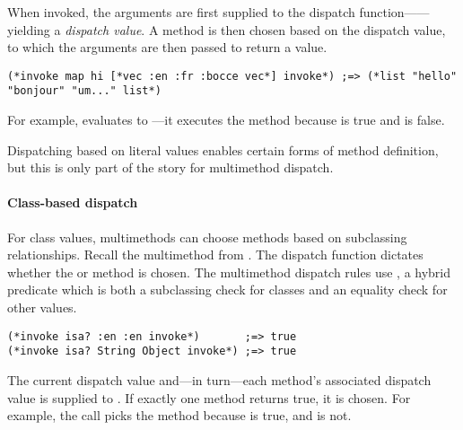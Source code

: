 When invoked, the arguments are first supplied to the dispatch function------yielding
a \emph{dispatch value}. A method is then chosen
based on the dispatch value, to which the arguments are then passed to return a value.
%
\begin{lstlisting}
(*invoke map hi [*vec :en :fr :bocce vec*] invoke*) ;=> (*list "hello" "bonjour" "um..." list*)
\end{lstlisting}
%
For example, 
 evaluates to ---it executes
the  method
because  is true
and  is false.

Dispatching based on literal values enables certain forms of method
definition, but this is only part of the story for multimethod dispatch.

\paragraph{Class-based dispatch}
For class values, multimethods can choose methods based on subclassing
relationships.
%
Recall the multimethod from . %
%
The dispatch function 
dictates 
whether the  or  method is chosen.
%
The multimethod dispatch rules use
, a hybrid predicate which is both a subclassing check for classes and
an equality check for other values.

\begin{lstlisting}
(*invoke isa? :en :en invoke*)       ;=> true
(*invoke isa? String Object invoke*) ;=> true
\end{lstlisting}
%
The current dispatch value and---in turn---each method's associated dispatch value
is supplied to . If exactly one method returns true, it is chosen.
%
For example,
the call
picks the  method because 
is true, and
is not.
%

